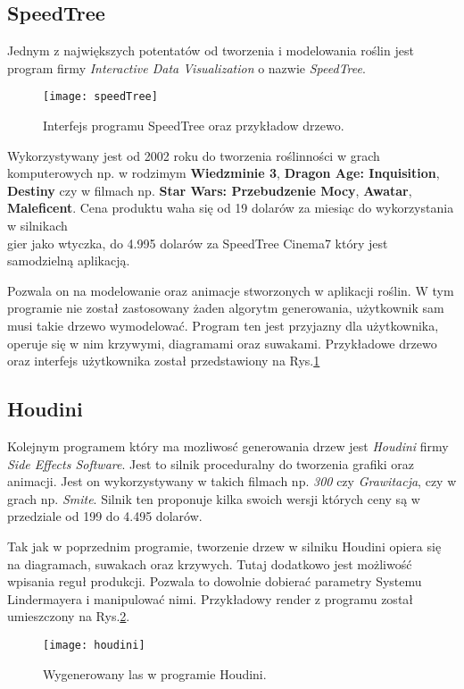 \documentclass[12pt]{report}
\renewcommand{\figurename}{Rys.}
\begin{document}
\begin{sloppypar}
\subsection{SpeedTree}

Jednym z największych potentatów od tworzenia i modelowania roślin jest program firmy \textit{Interactive Data Visualization} o nazwie \textit{SpeedTree}.
\begin{figure}[!htb]
\centering
\texttt{[image: speedTree]} 
\caption{Interfejs programu SpeedTree oraz przykładow drzewo. \cite{speedTreeZrodlo}\label{speedTree.obrazek}}
\end{figure}
 Wykorzystywany jest od 2002 roku do tworzenia roślinności w grach komputerowych np. w rodzimym \textbf{Wiedzminie 3}, \textbf{Dragon Age: Inquisition}, \textbf{Destiny} czy w filmach np. \textbf{Star Wars: Przebudzenie Mocy}, \textbf{Awatar}, \textbf{Maleficent}.
 Cena produktu waha się od 19 dolarów za miesiąc do wykorzystania w silnikach \\gier jako wtyczka, do 4.995 dolarów za SpeedTree Cinema7 który jest samodzielną aplikacją.
 \par Pozwala on na modelowanie oraz animacje stworzonych w aplikacji roślin. W tym programie nie został zastosowany żaden algorytm generowania, użytkownik sam musi takie drzewo wymodelować. Program ten jest przyjazny dla użytkownika, operuje się w nim krzywymi, diagramami oraz suwakami. Przykładowe drzewo oraz interfejs użytkownika został przedstawiony na \figurename \ref{speedTree.obrazek}


\subsection{Houdini}
Kolejnym programem który ma mozliwosć generowania drzew jest \textit{Houdini} firmy \textit{Side Effects Software}. Jest to silnik proceduralny do tworzenia grafiki oraz animacji. Jest on wykorzystywany w takich filmach np. \textit{300} czy \textit{Grawitacja}, czy w grach np. \textit{Smite}. 
Silnik ten proponuje kilka swoich wersji których ceny są w przedziale od 199  do 4.495 dolarów.

Tak jak w poprzednim programie, tworzenie drzew w silniku Houdini opiera się na diagramach, suwakach oraz krzywych. Tutaj dodatkowo jest możliwość wpisania reguł produkcji. Pozwala to dowolnie dobierać parametry Systemu Lindermayera i manipulować nimi. Przykładowy render z programu został umieszczony na \figurename \ref{houdini.obrazek}.
\begin{figure}[!htb]
\centering
\texttt{[image: houdini]} 
\caption{Wygenerowany las w programie Houdini.\cite{houdiniZrodlo}\label{houdini.obrazek}}
\end{figure}



\end{sloppypar}
\end{document}
